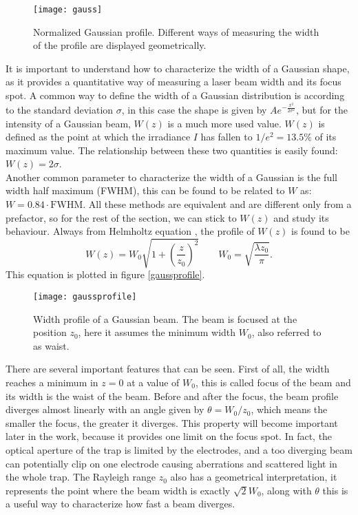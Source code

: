 \begin{figure}[H]
\centering
\texttt{[image: gauss]}
\caption{Normalized Gaussian profile. Different ways of measuring the width of the profile are displayed geometrically.}
\label{gauss}
\end{figure}
It is important to understand how to characterize the width of a Gaussian shape, as it provides a quantitative way of measuring a laser beam width and its focus spot. A common way to define the width of a Gaussian distribution is according to the standard deviation $\sigma$, in this case the shape is given by $Ae^{-\frac{x^2}{2\sigma^2}}$, but for the intensity of a Gaussian beam, $W(z)$ is a much more used value. $W(z)$ is defined as the point at which the irradiance $I$ has fallen to $1/e^2 = 13.5\%$ of its maximum value. The relationship between these two quantities is easily found: $W(z) = 2\sigma$.\\
Another common parameter to characterize the width of a Gaussian is the full width half maximum (FWHM), this can be found to be related to $W$ as: $W = 0.84\cdot \text{FWHM}$. All these methods are equivalent and are different only from a prefactor, so for the rest of the section, we can stick to $W(z)$ and study its behaviour. Always from Helmholtz equation \cite{saleh}, the profile of $W(z)$ is found to be
\begin{equation}
W(z) = W_0 \sqrt{1 + \left(\frac{z}{z_0}\right)^2}\qquad W_0 = \sqrt{\frac{\lambda z_0}{\pi}}.
\end{equation}
This equation is plotted in figure \eqref{gaussprofile}.
\begin{figure}[H]
\centering
\texttt{[image: gaussprofile]}
\caption{Width profile of a Gaussian beam. The beam is focused at the position $z_0$, here it assumes the minimum width $W_0$, also referred to as waist.}
\label{gaussprofile}
\end{figure}
There are several important features that can be seen. First of all, the width reaches a minimum in $z=0$ at a value of $W_0$, this is called focus of the beam and its width is the waist of the beam. Before and after the focus, the beam profile diverges almost linearly with an angle given by $\theta = W_0/z_0$, which means the smaller the focus, the greater it diverges. This property will become important later in the work, because it provides one limit on the focus spot. In fact, the optical aperture of the trap is limited by the electrodes, and a too diverging beam can potentially clip on one electrode causing aberrations and scattered light in the whole trap.  The Rayleigh range $z_0$ also has a geometrical interpretation, it represents the point where the beam width is exactly $\sqrt{2}W_0$, along with $\theta$ this is a useful way to characterize how fast a beam diverges.\\

